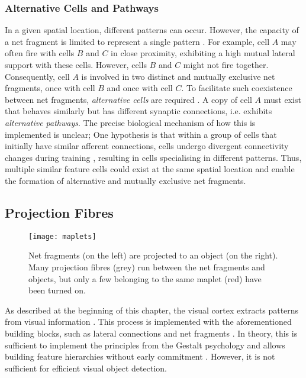 \subsubsection{Alternative Cells and Pathways}
In a given spatial location, different patterns can occur.
However, the capacity of a net fragment is limited to represent a single pattern .
For example, cell $A$ may often fire with cells $B$ and $C$ in close proximity, exhibiting a high mutual lateral support with these cells.
However, cells $B$ and $C$ might not fire together. Consequently, cell $A$ is involved in two distinct and mutually exclusive net fragments, once with cell $B$ and once with cell $C$.
To facilitate such coexistence between net fragments, \emph{alternative cells} are required . A copy of cell $A$ must exist that behaves similarly but has different synaptic connections, i.e. exhibits \emph{alternative pathways}.
The precise biological mechanism of how this is implemented is unclear; One hypothesis is that within a group of cells that initially have similar afferent connections, cells undergo divergent connectivity changes during training , resulting in cells specialising in different patterns. Thus, multiple similar feature cells could exist at the same spatial location and enable the formation of alternative and mutually exclusive net fragments.


\subsection{Projection Fibres}
\begin{figure}[h]
    \centering
    \texttt{[image: maplets]}
    \caption[An active maplet mapping net fragments to object prototypes]{Net fragments (on the left) are projected to an object (on the right). Many projection fibres (grey) run between the net fragments and objects, but only a few belonging to the same maplet (red) have been turned on.}
\end{figure}
%
As described at the beginning of this chapter, the visual cortex  extracts patterns from visual information . This process is implemented with the aforementioned building blocks, such as lateral connections  and net fragments \cite{von_der_malsburg_concerning_2018}. In theory, this is sufficient to implement the principles from the Gestalt psychology \cite{ellis_source_1938, kohler_gestalt_1992, wagemans_century_2012, hamlyn_psychology_2017} and allows building feature hierarchies without early commitment . However, it is not sufficient for efficient visual object detection.

